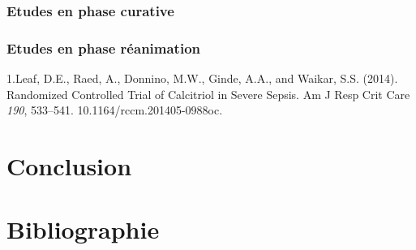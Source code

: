 \documentclass[
  a4paper,
  DIV=11,
  numbers=noendperiod,
  listof=totoc]{scrreprt}
\begin{document}
\hypertarget{etudes-en-phase-curative}{%
\subsection{Etudes en phase curative}\label{etudes-en-phase-curative}}

\hypertarget{etudes-en-phase-ruxe9animation}{%
\subsection{Etudes en phase
réanimation}\label{etudes-en-phase-ruxe9animation}}

1.Leaf, D.E., Raed, A., Donnino, M.W., Ginde, A.A., and Waikar, S.S.
(2014). Randomized Controlled Trial of Calcitriol in Severe Sepsis. Am J
Resp Crit Care \emph{190}, 533--541. 10.1164/rccm.201405-0988oc.

\newpage{}

\hypertarget{conclusion}{%
\chapter{Conclusion}\label{conclusion}}

\newpage{}

\hypertarget{bibliographie}{%
\chapter{Bibliographie}\label{bibliographie}}

\printbibliography[heading=none]
\end{document}
